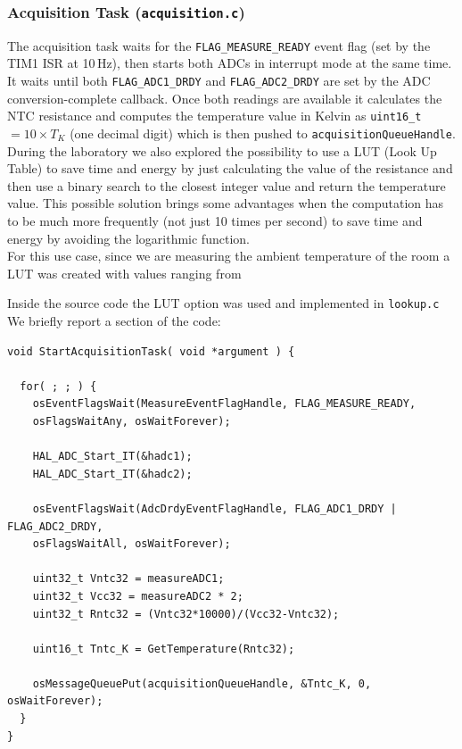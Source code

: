 \documentclass[../main.tex]{subfiles}
\begin{document}
\subsubsection*{Acquisition Task (\texttt{acquisition.c})}

The acquisition task waits for the \texttt{FLAG\_MEASURE\_READY} event flag (set by the TIM1 ISR at 10\,Hz), then starts both ADCs in interrupt mode at the same time. 
It waits until both \texttt{FLAG\_ADC1\_DRDY} and \texttt{FLAG\_ADC2\_DRDY} are set by the ADC conversion-complete callback. Once both readings are available it calculates the NTC resistance and computes the temperature value in Kelvin as \texttt{uint16\_t} $= 10 \times T_K$ (one decimal digit) which is then pushed to \texttt{acquisitionQueueHandle}.\\

During the laboratory we also explored the possibility to use a LUT (Look Up Table) to save time and energy by just calculating the value of the resistance and then use a binary search to the closest integer value and return the temperature value. This possible solution brings some advantages when the computation has to be much more frequently (not just 10 times per second) to save time and energy by avoiding the logarithmic function.\\

For this use case, since we are measuring the ambient temperature of the room a LUT was created with values ranging from 

Inside the source code the LUT option was used and implemented in \texttt{lookup.c}\\

We briefly report a section of the code:\\

\begin{lstlisting}
void StartAcquisitionTask( void *argument ) {

  for( ; ; ) {
    osEventFlagsWait(MeasureEventFlagHandle, FLAG_MEASURE_READY,
    osFlagsWaitAny, osWaitForever);

    HAL_ADC_Start_IT(&hadc1);
    HAL_ADC_Start_IT(&hadc2);

    osEventFlagsWait(AdcDrdyEventFlagHandle, FLAG_ADC1_DRDY | FLAG_ADC2_DRDY,
    osFlagsWaitAll, osWaitForever);

    uint32_t Vntc32 = measureADC1;
    uint32_t Vcc32 = measureADC2 * 2;
    uint32_t Rntc32 = (Vntc32*10000)/(Vcc32-Vntc32); 

    uint16_t Tntc_K = GetTemperature(Rntc32);

    osMessageQueuePut(acquisitionQueueHandle, &Tntc_K, 0, osWaitForever);
  }
}
\end{lstlisting}
\end{document}
